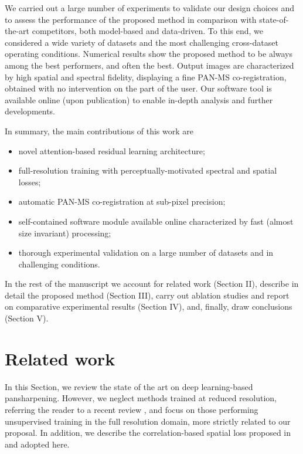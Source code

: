 \documentclass[journal]{IEEEtran}
\begin{document}
We carried out a large number of experiments to validate our design choices
and to assess the performance of the proposed method in comparison with state-of-the-art competitors, both model-based and data-driven.
To this end, we considered a wide variety of datasets and the most challenging cross-dataset operating conditions.
Numerical results show the proposed method to be always among the best performers, and often the best.
Output images are characterized by high spatial and spectral fidelity,
displaying a fine PAN-MS co-registration, obtained with no intervention on the part of the user.
Our software tool is available online (upon publication) to enable in-depth analysis and further developments.

In summary, the main contributions of this work are
\begin{itemize}
\item   novel attention-based residual learning architecture;
\item   full-resolution training with perceptually-motivated spectral and spatial losses;
\item   automatic PAN-MS co-registration at sub-pixel precision;
\item   self-contained software module available online characterized by fast (almost size invariant) processing;
\item   thorough experimental validation on a large number of datasets and in challenging conditions.
\end{itemize}

In the rest of the manuscript we
account for related work (Section II),
describe in detail the proposed method (Section III),
carry out ablation studies
and
report on comparative experimental results (Section IV),
and, finally, draw conclusions (Section V).


\section{Related work}

In this Section, we review the state of the art on deep learning-based pansharpening.
However, we neglect methods trained at reduced resolution, referring the reader to a recent review \cite{Deng2022},
and focus on those performing unsupervised training in the full resolution domain, more strictly related to our proposal.
In addition, we describe the correlation-based spatial loss proposed in \cite{Ciotola2022} and adopted here.
\end{document}
